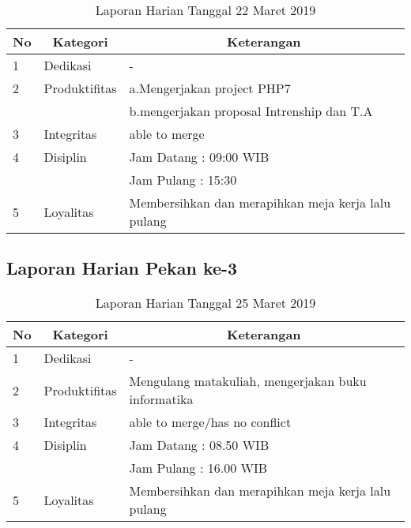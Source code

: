 \begin{table}[htp]
\caption{Laporan Harian Tanggal 22 Maret 2019}
\label{tab:lh220319}
\begin{tabular}{|l|l|l|}
\hline
\textbf{No} & \multicolumn{1}{c|}{\textbf{Kategori}} & \multicolumn{1}{c|}{\textbf{Keterangan}} \\ \hline
1 & Dedikasi & - \\ \hline
2 & Produktifitas & a.Mengerjakan project PHP7 \\
   & & b.mengerjakan proposal Intrenship dan T.A \\ \hline
3 & Integritas & able to merge \\ \hline
4 & Disiplin & Jam Datang : 09:00 WIB \\
   &  & Jam Pulang : 15:30 \\ \hline
5 & Loyalitas & Membersihkan dan merapihkan meja kerja lalu pulang \\ \hline
\end{tabular}
\end{table}


\subsection{Laporan Harian Pekan ke-3}


\begin{table}[htp]
\caption{Laporan Harian Tanggal 25 Maret 2019}
\label{tab:lh250319}
\begin{tabular}{|l|l|l|}
\hline
\textbf{No} & \multicolumn{1}{c|}{\textbf{Kategori}} & \multicolumn{1}{c|}{\textbf{Keterangan}} \\ \hline
1 & Dedikasi & - \\ \hline
2 & Produktifitas & Mengulang matakuliah, mengerjakan buku informatika \\
3 & Integritas & able to merge/has no conflict \\ \hline
4 & Disiplin & Jam Datang : 08.50 WIB \\
 &  & Jam Pulang : 16.00 WIB \\ \hline
5 & Loyalitas & Membersihkan dan merapihkan meja kerja lalu pulang  \\ \hline
\end{tabular}
\end{table}

